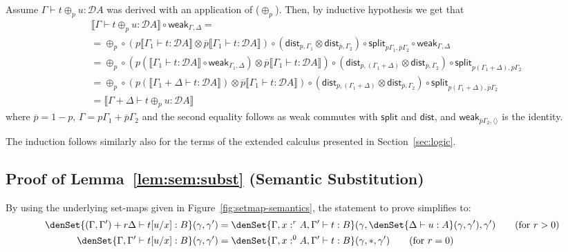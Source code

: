 \documentclass[a4paper,UKenglish,cleveref, autoref, thm-restate]{lipics-v2021}
\newcommand{\mprod}{\otimes}
\newcommand{\emptyctx}{\langle\rangle}
\newcommand{\splt}{\mathsf{split}}
\newcommand{\distribute}{\mathsf{dist}}
\newcommand{\semweak}{\mathsf{weak}}
\newcommand{\ts}{\vdash}
\newcommand{\hastype}[3]{#1\ts #2 : #3}
\newcommand{\TD}{\mathcal{D}}
\newcommand{\den}[1]{\llbracket #1\rrbracket}
\begin{document}
\begin{description}[wide, font=\sc]
\item[Case ($\oplus_p$):] Assume $\hastype{\Gamma}{t \oplus_p u}{\TD A}$ was derived with an application of ($\oplus_p$). Then, by inductive hypothesis we get that
\begin{align*}
&\den{\hastype{\Gamma}{t \oplus_p u}{\TD A}} \circ \semweak_{\Gamma,\Delta} = {} \\
&= \oplus_p \circ 
(p\den{\hastype{\Gamma_1}{t}{\TD A}} \mprod 
 \overline{p}\den{\hastype{\Gamma_1}{t}{\TD A}}) \circ
 (\distribute_{p,\Gamma_1}\mprod\distribute_{\overline{p},\Gamma_2})
    \circ\splt_{p\Gamma_1,\overline p\Gamma_2} \circ \semweak_{\Gamma,\Delta} \\
&= \oplus_p \circ 
(p(\den{\hastype{\Gamma_1}{t}{\TD A}}\circ\semweak_{\Gamma_1,\Delta}) \mprod 
 \overline{p}\den{\hastype{\Gamma_1}{t}{\TD A}}) \circ
 (\distribute_{p,(\Gamma_1+\Delta)} \mprod \distribute_{\overline{p},\Gamma_2})
    \circ\splt_{p(\Gamma_1+\Delta),\overline p\Gamma_2} \\
&= \oplus_p \circ 
(p(\den{\hastype{\Gamma_1+\Delta}{t}{\TD A}}) \mprod 
 \overline{p}\den{\hastype{\Gamma_1}{t}{\TD A}}) \circ
 (\distribute_{p,(\Gamma_1+\Delta)} \mprod \distribute_{\overline{p},\Gamma_2})
    \circ\splt_{p(\Gamma_1+\Delta),\overline p\Gamma_2} \\
&=\den{\hastype{\Gamma+\Delta}{t \oplus_p u}{\TD A}}
\end{align*}
where $\overline p = 1-p$, $\Gamma = p\Gamma_1 + \overline{p}\Gamma_2$ and the second equality follows as weak commutes with $\splt$ and $\distribute$, and $\semweak_{\overline{p}\Gamma_2,\emptyctx}$ is the identity.
\end{description}
The induction follows similarly also for the terms of the extended calculus 
presented in Section~\ref{sec:logic}.

\subsection*{Proof of Lemma~\ref{lem:sem:subst} (Semantic Substitution)}
By using the underlying set-maps given in Figure~\ref{fig:setmap-semantics}, the statement to prove simplifies to:
\begin{align*}
\denSet{\hastype{(\Gamma,\Gamma')+r\Delta}{t[u/x]}{B}}(\gamma,\gamma')
&= \denSet{\hastype{\Gamma,x:^rA,\Gamma'}tB}(\gamma,\denSet{\hastype{\Delta}{u}{A}}(\gamma,\gamma'),\gamma') \tag{for $r>0$} \\
\denSet{\hastype{\Gamma,\Gamma'}{t[u/x]}{B}}(\gamma,\gamma')
&= \denSet{\hastype{\Gamma,x:^0A,\Gamma'}tB}(\gamma,*,\gamma') \tag{for $r=0$}
\end{align*}
\end{document}
